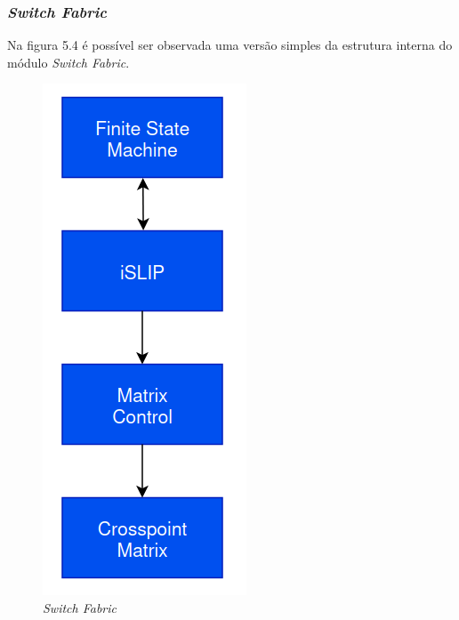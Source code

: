 \subsubsection{\textit{Switch Fabric}}

Na figura 5.4 é possível ser observada uma versão simples da estrutura interna do módulo \textit{Switch Fabric}.

\begin{figure}[H]
  \centering
  \includegraphics[width=0.3 \textwidth]{Fabric.png}
  \caption[\textit{Switch Fabric}]{\textit{Switch Fabric}}
  \label{fig:airbus1}
\end{figure} 

